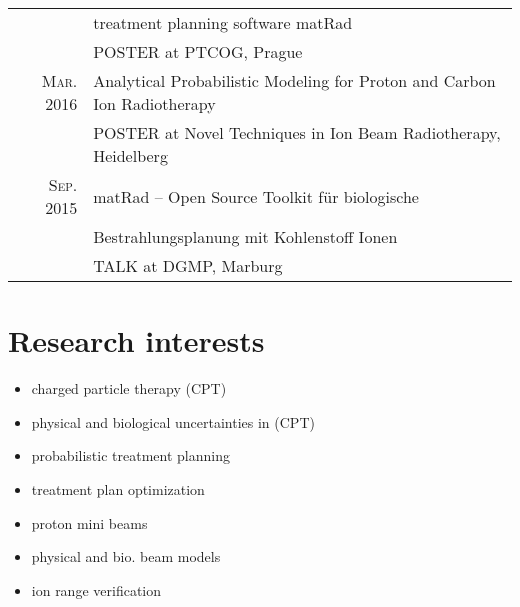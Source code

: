 \documentclass[a4paper,10pt]{article}
\begin{document}
\begin{tabular}{rl}
                                & treatment planning software matRad \\
                                &POSTER at PTCOG, Prague\\ \hline
\textsc{Mar.} 2016 & Analytical Probabilistic Modeling for Proton and Carbon Ion Radiotherapy \\
                                & POSTER at Novel Techniques in Ion Beam Radiotherapy, Heidelberg\\ \hline
\textsc{Sep.} 2015 & matRad – Open Source Toolkit für biologische  \\
                                &  Bestrahlungsplanung mit Kohlenstoff Ionen\\
                                &TALK at DGMP, Marburg\\
\end{tabular}

\pagebreak


\section{Research interests}

\setlength{\columnsep}{0cm}
\begin{multicols}{2}
\begin{itemize}
  \item charged particle therapy (CPT)
  \item physical and biological uncertainties in (CPT)
  \item probabilistic treatment planning
  \item treatment plan optimization
  \item proton mini beams
  \item physical and bio. beam models
  \item ion range verification
\end{itemize}
\end{multicols}

\vspace{0.3cm}
\end{document}
